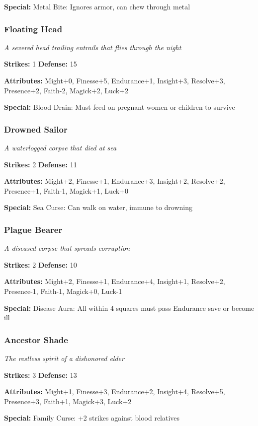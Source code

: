 \documentclass[10pt,twoside]{article}
\begin{document}
\textbf{Special:} Metal Bite: Ignores armor, can chew through metal

\subsubsection{Floating Head}
\textit{A severed head trailing entrails that flies through the night}

\textbf{Strikes:} 1 \quad \textbf{Defense:} 15

\textbf{Attributes:} Might+0, Finesse+5, Endurance+1, Insight+3, Resolve+3, Presence+2, Faith-2, Magick+2, Luck+2

\textbf{Special:} Blood Drain: Must feed on pregnant women or children to survive

\subsubsection{Drowned Sailor}
\textit{A waterlogged corpse that died at sea}

\textbf{Strikes:} 2 \quad \textbf{Defense:} 11

\textbf{Attributes:} Might+2, Finesse+1, Endurance+3, Insight+2, Resolve+2, Presence+1, Faith-1, Magick+1, Luck+0

\textbf{Special:} Sea Curse: Can walk on water, immune to drowning

\subsubsection{Plague Bearer}
\textit{A diseased corpse that spreads corruption}

\textbf{Strikes:} 2 \quad \textbf{Defense:} 10

\textbf{Attributes:} Might+2, Finesse+1, Endurance+4, Insight+1, Resolve+2, Presence-1, Faith-1, Magick+0, Luck-1

\textbf{Special:} Disease Aura: All within 4 squares must pass Endurance save or become ill

\subsubsection{Ancestor Shade}
\textit{The restless spirit of a dishonored elder}

\textbf{Strikes:} 3 \quad \textbf{Defense:} 13

\textbf{Attributes:} Might+1, Finesse+3, Endurance+2, Insight+4, Resolve+5, Presence+3, Faith+1, Magick+3, Luck+2

\textbf{Special:} Family Curse: +2 strikes against blood relatives
\end{document}
